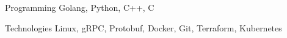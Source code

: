 

\begin{cvskills}

  \cvskill
  {Programming} %
  {Golang, Python, C++, C} %

  \cvskill
  {Technologies} %
  {Linux, gRPC, Protobuf, Docker, Git, Terraform, Kubernetes} %

\end{cvskills}
